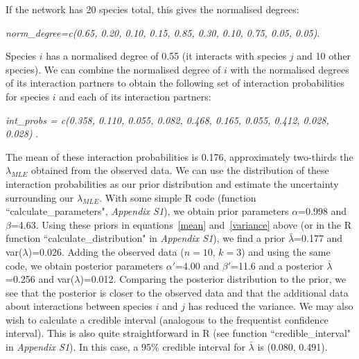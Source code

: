 \documentclass[12pt]{article}
\begin{document}
\begin{spacing}{2.0}
    If the network has 20 species total, this gives the normalised degrees:

    \vspace{12pt}
    \noindent\emph{
      norm\_degree=c(0.65, 0.20, 0.10, 0.15, 0.85, 0.30, 0.10, 0.75, 0.05, 0.05)}.
      \vspace{12pt}

    Species $i$ has a normalised degree of 0.55 (it interacts with species $j$ and 10 other species). We can combine the normalised degree of $i$ with the normalised degrees of its interaction partners to obtain the following set of interaction probabilities for species $i$ and each of its interaction partners:

    \vspace{12pt}
    \noindent\emph{
       int\_probs = c(0.358, 0.110, 0.055, 0.082, 0.468, 0.165, 0.055, 0.412, 0.028, 0.028) }.
      \vspace{12pt}

    The mean of these interaction probabilities is 0.176, approximately two-thirds the $\lambda_{MLE}$ obtained from the observed data. We can use the distribution of these interaction probabilities as our prior distribution and estimate the uncertainty surrounding our $\lambda_{MLE}$. With some simple R code (function ``calculate\_parameters", \emph{Appendix S1}), we obtain prior parameters $\alpha$=0.998 and $\beta$=4.63. Using these priors in equations~\ref{mean} and~\ref{variance} above (or in the R function ``calculate\_distribution" in \emph{Appendix S1}), we find a prior $\bar\lambda$=0.177 and var($\lambda$)=0.026. Adding the observed data ($n=10$, $k=3$) and using the same code, we obtain posterior parameters $\alpha'$=4.00 and $\beta'$=11.6 and a posterior $\bar\lambda$=0.256 and var($\lambda$)=0.012. Comparing the posterior distribution to the prior, we see that the posterior is closer to the observed data and that the additional data about interactions between species $i$ and $j$ has reduced the variance. We may also wish to calculate a credible interval (analogous to the frequentist confidence interval). This is also quite straightforward in R (see function ``credible\_interval" in \emph{Appendix S1}). In this case, a 95\% credible interval for $\bar\lambda$ is (0.080, 0.491).



\end{spacing}
\end{document}
